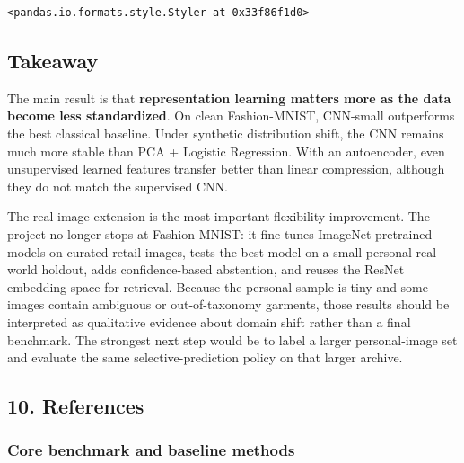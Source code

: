 \documentclass[11pt]{article}
\begin{document}
    
    \begin{Verbatim}[commandchars=\\\{\}]
<pandas.io.formats.style.Styler at 0x33f86f1d0>
    \end{Verbatim}

    
    \subsection{Takeaway}\label{takeaway}

The main result is that \textbf{representation learning matters more as
the data become less standardized}. On clean Fashion-MNIST, CNN-small
outperforms the best classical baseline. Under synthetic distribution
shift, the CNN remains much more stable than PCA + Logistic Regression.
With an autoencoder, even unsupervised learned features transfer better
than linear compression, although they do not match the supervised CNN.

The real-image extension is the most important flexibility improvement.
The project no longer stops at Fashion-MNIST: it fine-tunes
ImageNet-pretrained models on curated retail images, tests the best
model on a small personal real-world holdout, adds confidence-based
abstention, and reuses the ResNet embedding space for retrieval. Because
the personal sample is tiny and some images contain ambiguous or
out-of-taxonomy garments, those results should be interpreted as
qualitative evidence about domain shift rather than a final benchmark.
The strongest next step would be to label a larger personal-image set
and evaluate the same selective-prediction policy on that larger
archive.

    \subsection{10. References}\label{references}

\subsubsection{Core benchmark and baseline
methods}\label{core-benchmark-and-baseline-methods}
\end{document}
